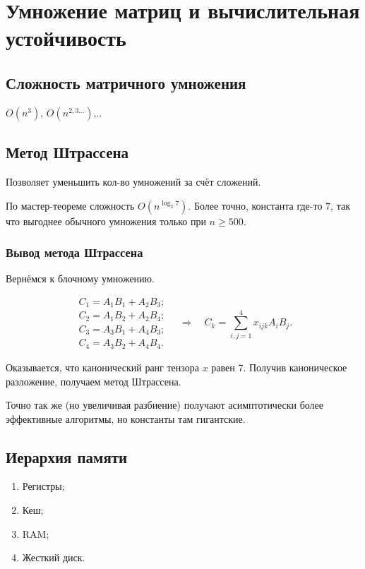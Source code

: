 \section{Умножение матриц и вычислительная устойчивость}

\subsection{Сложность матричного умножения}

$O(n^3)$, $O(n^{2,3\ldots})$,..

\subsection{Метод Штрассена}

Позволяет уменьшить кол-во умножений за счёт сложений.

По мастер-теореме сложность $O(n^{\log_2 7})$. Более точно, константа где-то 7,
так что выгоднее обычного умножения только при $n \ge 500$.

\subsubsection{Вывод метода Штрассена}

Вернёмся к блочному умножению.

\[
    \begin{array}{l}
        C_1 = A_1 B_1 + A_2 B_3; \\
        C_2 = A_1 B_2 + A_2 B_4; \\
        C_3 = A_3 B_1 + A_4 B_3; \\
        C_4 = A_3 B_2 + A_4 B_4.
    \end{array}
    \quad\Rightarrow\quad
    C_k = \sum_{i,j = 1}^4 x_{ijk} A_i B_j.
\]

Оказывается, что канонический ранг тензора $x$ равен 7. Получив каноническое
разложение, получаем метод Штрассена.

Точно так же (но увеличивая разбиение) получают асимптотически более эффективные
алгоритмы, но константы там гигантские.

\subsection{Иерархия памяти}

\begin{enumerate}
    \item Регистры;
    \item Кеш;
    \item RAM;
    \item Жесткий диск.
\end{enumerate}

